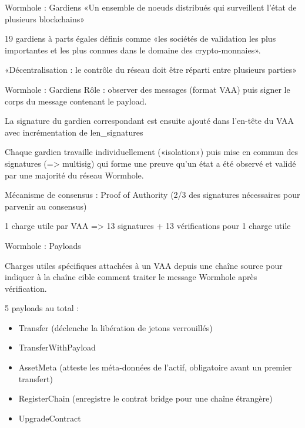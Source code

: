 \begin{frame}{Wormhole : Gardiens}
«Un ensemble de noeuds distribués qui surveillent l'état de plusieurs blockchains»
\newline

19 gardiens à parts égales définis comme «les sociétés de validation les plus importantes et les plus connues dans le domaine des crypto-monnaies».
\newline

«Décentralisation : le contrôle du réseau doit être réparti entre plusieurs parties»
\end{frame}

\begin{frame}{Wormhole : Gardiens}
Rôle : observer des messages (format VAA) puis signer le corps du message contenant le payload.\newline

La signature du gardien correspondant est ensuite ajouté dans l'en-tête du VAA avec incrémentation de len\_signatures\newline

Chaque gardien travaille individuellement («isolation») puis mise en commun des signatures (=> multisig) qui forme une preuve qu'un état a été observé et validé par une majorité du réseau Wormhole.\newline

Mécanisme de consensus : Proof of Authority (2/3 des signatures nécessaires pour parvenir au consensus)\newline

1 charge utile par VAA => 13 signatures + 13 vérifications pour 1 charge utile
\end{frame}

\begin{frame}{Wormhole : Payloads}

Charges utiles spécifiques attachées à un VAA depuis une chaîne source pour indiquer à la chaîne cible comment traiter le message Wormhole après vérification.\newline

5 payloads au total :
\begin{itemize}
    \item Transfer (déclenche la libération de jetons verrouillés) 
    \item TransferWithPayload
    \item AssetMeta (atteste les méta-données de l'actif, obligatoire avant un premier transfert)
    \item RegisterChain (enregistre le contrat bridge pour une chaîne étrangère)
    \item UpgradeContract
\end{itemize}
\end{frame}

